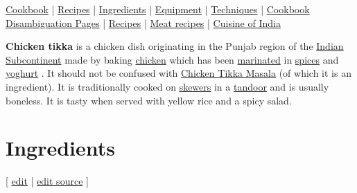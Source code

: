 \documentclass[11pt,a4paper]{article}
\begin{document}
\href{https://en.wikibooks.org/wiki/Cookbook:Table\_of\_Contents}{Cookbook} | \href{https://en.wikibooks.org/wiki/Cookbook:Recipes}{Recipes} | \href{https://en.wikibooks.org/wiki/Cookbook:Ingredients}{Ingredients} | \href{https://en.wikibooks.org/wiki/Cookbook:Equipment}{Equipment} | \href{https://en.wikibooks.org/wiki/Cookbook:Cooking\_Techniques}{Techniques} | \href{https://en.wikibooks.org/wiki/Category:Cookbook\_disambiguation\_pages}{Cookbook Disambiguation Pages} | \href{https://en.wikibooks.org/wiki/Category:Recipes}{Recipes} | \href{https://en.wikibooks.org/wiki/Cookbook:Meat\_Recipes}{Meat recipes} | \href{https://en.wikibooks.org/wiki/Cookbook:Cuisine\_of\_India}{Cuisine of India}

\textbf{Chicken tikka} is a chicken dish originating in the Punjab region of the \href{https://en.wikibooks.org/wiki/Cookbook:Cuisine\_of\_India}{Indian Subcontinent} made by baking \href{https://en.wikibooks.org/wiki/Cookbook:Chicken}{chicken} which has been \href{https://en.wikibooks.org/wiki/Cookbook:Marinating}{marinated} in \href{https://en.wikibooks.org/wiki/Cookbook:Spices\_and\_herbs}{spices} and \href{https://en.wikibooks.org/wiki/Cookbook:Yogurt}{yoghurt} . It should not be confused with \href{https://en.wikibooks.org/wiki/Cookbook:Chicken\_Tikka\_Masala}{Chicken Tikka Masala} (of which it is an ingredient). It is traditionally cooked on \href{https://en.wikibooks.org/wiki/Cookbook:Skewer}{skewers} in a \href{https://en.wikibooks.org/wiki/Cookbook:Tandoor}{tandoor} and is usually boneless. It is tasty when served with yellow rice and a spicy salad.

\section{Ingredients}

[ \href{https://en.wikibooks.org/w/index.php?title=Cookbook:Chicken\_Tikka\&veaction=edit\&section=1}{edit} | \href{https://en.wikibooks.org/w/index.php?title=Cookbook:Chicken\_Tikka\&action=edit\&section=1}{edit source} ]
\end{document}
